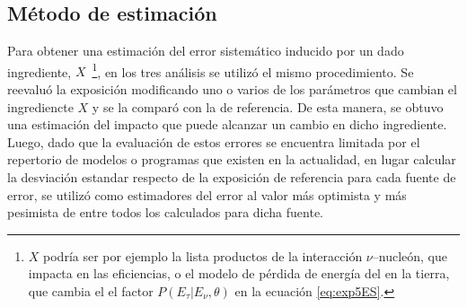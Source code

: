 	\subsection{Método de estimación}
	
	Para obtener una estimación del error sistemático inducido por un dado ingrediente, $X$~\footnote{$X$ podría ser por ejemplo la lista productos de la interacción $\nu$--nucleón, que impacta en las eficiencias, o el modelo de pérdida de energía del \tauon{} en la tierra, que cambia el el factor $P(E_\tau|E_\nu,\theta)$ en la ecuación \ref{eq:exp5ES}.}, en los tres análisis se utilizó el mismo procedimiento.
	Se reevaluó la exposición modificando uno o varios de los parámetros que cambian el ingrediencte $X$ y se la comparó con la de referencia.
	De esta manera, se obtuvo una estimación del impacto que puede alcanzar un cambio en dicho ingrediente.
	Luego, dado que la evaluación de estos errores se encuentra limitada por el repertorio de modelos o programas que existen en la actualidad, en lugar calcular la desviación estandar respecto de la exposición de referencia para cada fuente de error, se utilizó como estimadores del error al valor más optimista y más pesimista de entre todos los calculados para dicha fuente.
	
